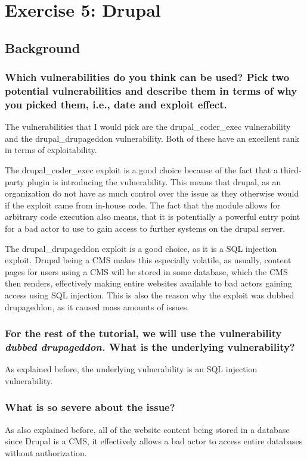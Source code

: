 \section{Exercise 5: Drupal}
\subsection{Background}
\subsubsection{Which vulnerabilities do you think can be used? Pick two potential vulnerabilities and describe them in terms of why you picked them, i.e., date and exploit effect.}
The vulnerabilities that I would pick are the drupal\_coder\_exec vulnerability and the drupal\_drupageddon vulnerability. Both of these have an excellent rank in terms of exploitability.

The drupal\_coder\_exec exploit is a good choice because of the fact that a third-party plugin is introducing the vulnerability. This means that drupal, as an organization do not have as much control over the issue as they otherwise would if the exploit came from in-house code. The fact that the module allows for arbitrary code execution also means, that it is potentially a powerful entry point for a bad actor to use to gain access to further systems on the drupal server.

The drupal\_drupageddon exploit is a good choice, as it is a SQL injection exploit. Drupal being a CMS makes this especially volatile, as usually, content pages for users using a CMS will be stored in some database, which the CMS then renders, effectively making entire websites available to bad actors gaining access using SQL injection. This is also the reason why the exploit was dubbed drupageddon, as it caused mass amounts of issues.
\subsubsection{For the rest of the tutorial, we will use the vulnerability \textit{dubbed drupageddon.} What is the underlying vulnerability?}
As explained before, the underlying vulnerability is an SQL injection vulnerability.

\subsubsection{What is so severe about the issue?}
As also explained before, all of the website content being stored in a database since Drupal is a CMS, it effectively allows a bad actor to access entire databases without authorization.

